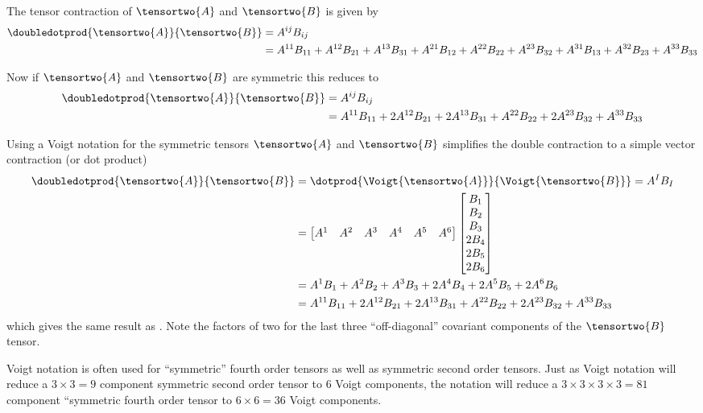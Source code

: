 The tensor contraction of $\tensortwo{A}$ and $\tensortwo{B}$ is given by
\begin{align}
  \doubledotprod{\tensortwo{A}}{\tensortwo{B}}&=A^{ij}B_{ij} \\
  &=A^{11}B_{11}+A^{12}B_{21}+A^{13}B_{31}+A^{21}B_{12}+A^{22}B_{22}+A^{23}B_{32}+A^{31}B_{13}+A^{32}B_{23}+A^{33}B_{33}
\end{align}

Now if $\tensortwo{A}$ and $\tensortwo{B}$ are symmetric this reduces to
\begin{align}
  \doubledotprod{\tensortwo{A}}{\tensortwo{B}}&=A^{ij}B_{ij} \\
  &=A^{11}B_{11}+2A^{12}B_{21}+2A^{13}B_{31}+A^{22}B_{22}+2A^{23}B_{32}+A^{33}B_{33}
  \label{eqn:VoigtNotationDoubleContraction}
\end{align}

Using a Voigt notation for the symmetric tensors $\tensortwo{A}$ and
$\tensortwo{B}$ simplifies the double contraction to a simple vector
contraction (or dot product) \ie
\begin{align}
  \doubledotprod{\tensortwo{A}}{\tensortwo{B}}&=\dotprod{\Voigt{\tensortwo{A}}}{\Voigt{\tensortwo{B}}}=A^{I}B_{I}\\ &=\begin{bmatrix}
  A^{1} & A^{2} & A^{3} & A^{4} & A^{5} &
  A^{6} \end{bmatrix} \begin{bmatrix} B_{1} \\ B_{2} \\ B_{3}
    \\ 2B_{4} \\ 2B_{5} \\ 2B_{6}
  \end{bmatrix} \\
  &=A^{1}B_{1} + A^{2}B_{2} + A^{3}B_{3} + 2A^{4}B_{4} + 2A^{5}B_{5} + 2A^{6}B_{6} \\
  &=A^{11}B_{11}+2A^{12}B_{21}+2A^{13}B_{31}+A^{22}B_{22}+2A^{23}B_{32}+A^{33}B_{33}
\end{align}
which gives the same result as
. Note the factors of two
for the last three ``off-diagonal'' covariant components of the
$\tensortwo{B}$ tensor.

Voigt notation is often used for ``symmetric'' fourth order tensors as
well as symmetric second order tensors. Just as Voigt notation will
reduce a $3 \times 3=9$ component symmetric second order tensor to $6$
Voigt components, the notation will reduce a $3\times 3\times 3\times
3=81$ component ``symmetric fourth order tensor to $6\times 6=36$
Voigt components.

